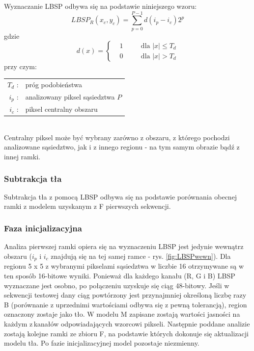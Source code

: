 Wyznaczanie LBSP odbywa się na podstawie niniejszego wzoru:
\begin{equation}
LBSP_{R}(x_{c},y_{c}) = 
\sum_{p=0}^{P-1}d(i_{p}-i_{c})2^p
\end{equation}
gdzie
\begin{equation}
d(x)=\left\{
\begin{split}
&1 & \quad &\text{dla $|x|\leq T_{d}$} \\
&0 & \quad &\text{dla $|x|>T_{d}$}
\end{split}
\right.
\end{equation}
przy czym:\\ 
\hspace*{3em}
\begin{tabular}{r p{}}
$T_{d}$ : &  próg podobieństwa\\
$i_{p}$ : & analizowany piksel sąsiedztwa $P$\\
$i_{c}$ : & piksel centralny obszaru\\
\end{tabular} \\

Centralny piksel może być wybrany zarówno z obszaru, z którego pochodzi analizowane sąsiedztwo, jak i z innego regionu - na tym samym obrazie bądź z innej ramki.
\subsubsection{Subtrakcja tła}
Subtrakcja tła z pomocą LBSP odbywa się na podstawie porównania obecnej ramki z modelem uzyskanym z F pierwszych sekwencji. 
\subsubsection{Faza inicjalizacyjna}
Analiza pierwszej ramki opiera się na wyznaczeniu LBSP  jest jedynie wewnątrz obszaru ($i_{p}$ i $i_{c}$ znajdują się na tej samej ramce - rys. \ref{fig:LBSPwewn}). Dla regionu 5 x 5 z wybranymi pikselami sąsiedztwa w liczbie 16 otrzymywane są w ten sposób 16-bitowe wyniki. Ponieważ dla każdego kanału (R, G i B) LBSP wyznaczane jest osobno, po połączeniu uzyskuje się ciąg 48-bitowy. Jeśli w sekwencji testowej dany ciąg powtórzony jest przynajmniej określoną liczbę razy B (porównanie z uprzednimi wartościami odbywa się z pewną tolerancją), region oznaczony zostaje jako tło. W modelu M zapisane zostają wartości jasności na każdym z\,kanałów odpowiadających wzorcowi pikseli. Następnie poddane analizie zostają kolejne ramki ze zbioru F, na podstawie których dokonuje się aktualizacji modelu tła. Po fazie inicjalizacyjnej model pozostaje niezmienny.
